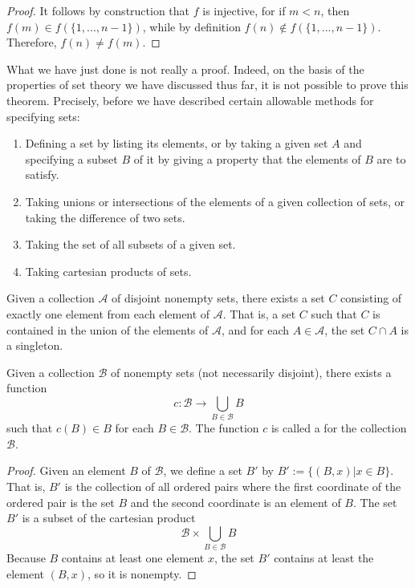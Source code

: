\documentclass[12pt, a4paper, oneside, openright, titlepage]{book}
\begin{document}
\begin{appendices}
\begin{proof}
        It follows by construction that $f$ is injective, for if $m < n$, then $f(m) \in f(\{1,...,n-1\})$, while by definition $f(n) \notin f(\{1,...,n-1\})$. Therefore, $f(n) \neq f(m)$.
    \end{proof}

    \begin{remark}
        What we have just done is not really a proof. Indeed, on the basis of the properties of set theory we have discussed thus far, it is not possible to prove this theorem. Precisely, before we have described certain allowable methods for specifying sets:\begin{enumerate}
            \item Defining a set by listing its elements, or by taking a given set $A$ and specifying a subset $B$ of it by giving a property that the elements of $B$ are to satisfy.
            \item Taking unions or intersections of the elements of a given collection of sets, or taking the difference of two sets.
            \item Taking the set of all subsets of a given set.
            \item Taking cartesian products of sets.
        \end{enumerate}
    \end{remark}

    \begin{axiom}
        Given a collection $\mathscr{A}$ of disjoint nonempty sets, there exists a set $C$ consisting of exactly one element from each element of $\mathscr{A}$. That is, a set $C$ such that $C$ is contained in the union of the elements of $\mathscr{A}$, and for each $A \in \mathscr{A}$, the set $C\cap A$ is a singleton.
    \end{axiom}

    \begin{lemma}
        Given a collection $\mathscr{B}$ of nonempty sets (not necessarily disjoint), there exists a function \begin{equation}
            c:\mathscr{B}\rightarrow \bigcup\limits_{B\in\mathscr{B}}B
        \end{equation}
        such that $c(B) \in B$ for each $B \in \mathscr{B}$. The function $c$ is called a  for the collection $\mathscr{B}$.
    \end{lemma}
    \begin{proof}
        Given an element $B$ of $\mathscr{B}$, we define a set $B'$ by $B' :=\{(B,x)\vert x \in B\}$. That is, $B'$ is the collection of all ordered pairs where the first coordinate of the ordered pair is the set $B$ and the second coordinate is an element of $B$. The set $B'$ is a subset of the cartesian product \begin{equation*}
            \mathscr{B}\times \bigcup\limits_{B\in \mathscr{B}}B
        \end{equation*}
        Because $B$ contains at least one element $x$, the set $B'$ contains at least the element $(B,x)$, so it is nonempty.


\end{proof}
\end{appendices}
\end{document}
